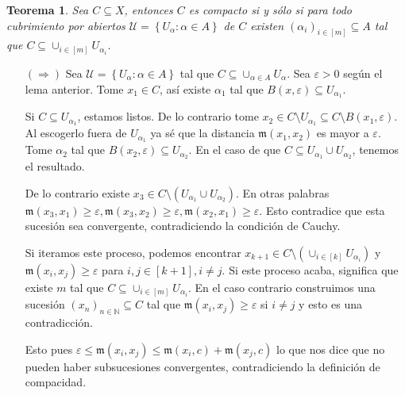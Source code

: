 \documentclass[12pt]{article}
\theoremstyle{plain}
\newtheorem{Th}{Teorema}[subsection]   %
\theoremstyle{definition}
\theoremstyle{remark}
\numberwithin{equation}{section}
\newcommand{\bN}{\mathbb{N}}        %
\newcommand{\mm}{\mathfrak{m}}      %
\newcommand{\cU}{\mathcal{U}}       %
\renewcommand{\geq}{\geqslant}      %
\renewcommand{\leq}{\leqslant}      %
\renewcommand{\:}{\colon}           %
\newcommand{\conj}[1]{\left\lbrace#1\right\rbrace}
\newcommand{\bonj}[1]{\left\lbrack#1\right\rbrack}
\begin{document}
\begin{multicols}{2}

\begin{Th}\label{equivBWCubrimientos}
  Sea $C\subseteq X$, entonces $C$ es compacto si y sólo si para todo cubrimiento por abiertos $\cU=\conj{U_\alpha\colon \alpha\in A}$ de $C$ existen $(\alpha_i)_{i\in\bonj{m}}\subseteq A$ tal que $C\subseteq\cup_{i\in\bonj{m}}U_{\alpha_i}$.
\end{Th}

\begin{ptcbp}
\begin{enumerate}
  \item[$(\Rightarrow)$] Sea $\cU=\conj{U_\alpha\colon \alpha\in A}$ tal que $C\subseteq\cup_{\alpha\in A}U_{\alpha}$. Sea $\varepsilon>0$ según el lema anterior. Tome $x_1\in C$, así existe $\alpha_1$ tal que $B(x,\varepsilon)\subseteq U_{\alpha_1}$. \par
      Si $C\subseteq U_{\alpha_1}$, estamos listos. De lo contrario tome $x_2\in C\setminus U_{\alpha_1}\subseteq C\setminus B(x_1,\varepsilon)$. Al escogerlo fuera de $U_{\alpha_1}$ ya sé que la distancia $\mm(x_1,x_2)$ es mayor a $\varepsilon$. Tome $\alpha_2$ tal que $B(x_2,\varepsilon)\subseteq U_{\alpha_2}$. En el caso de que $C\subseteq U_{\alpha_1}\cup U_{\alpha_2}$, tenemos el resultado.\par
      De lo contrario existe $x_3\in C\setminus(U_{\alpha_1}\cup U_{\alpha_2})$. En otras palabras $\mm(x_3,x_1)\geq\varepsilon, \mm(x_3,x_2)\geq\varepsilon, \mm(x_2,x_1)\geq\varepsilon$. Esto contradice que esta sucesión sea convergente, contradiciendo la condición de Cauchy.\par
      Si iteramos este proceso, podemos encontrar $x_{k+1}\in C\setminus(\cup_{i\in\bonj{k}}U_{\alpha_i})$ y $\mm(x_i,x_j)\geq\varepsilon$ para $i,j\in\bonj{k+1}, i\neq j$. Si este proceso acaba, significa que existe $m$ tal que $C\subseteq\cup_{i\in\bonj{m}}U_{\alpha_i}$. En el caso contrario construimos una sucesión $(x_n)_{n\in\bN}\subseteq C$ tal que $\mm(x_i,x_j)\geq \varepsilon$ si $i\neq j$ y esto es una contradicción.\par
      Esto pues $\varepsilon\leq\mm(x_i,x_j)\leq \mm(x_i,c)+\mm(x_j,c)$ lo que nos dice que no pueden haber subsucesiones convergentes, contradiciendo la definición de compacidad.

\end{enumerate}
\end{ptcbp}
\end{multicols}
\end{document}
